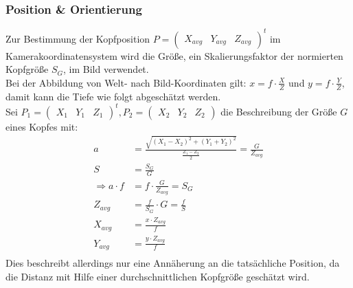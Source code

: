 \subsubsection{Position \& Orientierung}
\label{OpenFace_Pos_Ori}
Zur Bestimmung der Kopfposition $P= \begin{pmatrix}
X_{avg} & Y_{avg} & Z_{avg}
\end{pmatrix}^t$ im Kamerakoordinatensystem wird die Größe, ein Skalierungsfaktor der normierten Kopfgröße $S_G$, im Bild verwendet.\\
Bei der Abbildung von Welt- nach Bild-Koordinaten gilt: $x=f\cdot \frac{X}{Z}$ und $ y=f\cdot \frac{Y}{Z}$, damit kann die Tiefe wie folgt abgeschätzt werden.\\
Sei $P_1 = \begin{pmatrix}
X_1&Y_1&Z_1
\end{pmatrix}^t, P_2= \begin{pmatrix}
X_2&Y_2&Z_2
\end{pmatrix}$ die Beschreibung der Größe $G$ eines Kopfes mit:\\
\begin{align*}
a &= \frac{\sqrt{(X_1-X_2)^2+(Y_1+Y_2)^2}}{\frac{Z_1-Z_2}{2}} =\frac{G}{Z_{avg}}\\
S &= \frac{S_G}{G}\\
\Rightarrow a\cdot f &= f\cdot\frac{G}{Z_{avg}} = S_G\\
Z_{avg} &= \frac{f}{S_G}\cdot G = \frac{f}{S}\\
X_{avg} &= \frac{x \cdot Z_{avg}}{f}\\
Y_{avg} &= \frac{y \cdot Z_{avg}}{f}\\
\end{align*}
Dies beschreibt allerdings nur eine Annäherung an die tatsächliche Position, da die Distanz mit Hilfe einer durchschnittlichen Kopfgröße geschätzt wird.\\
\cite{OpenFace}
